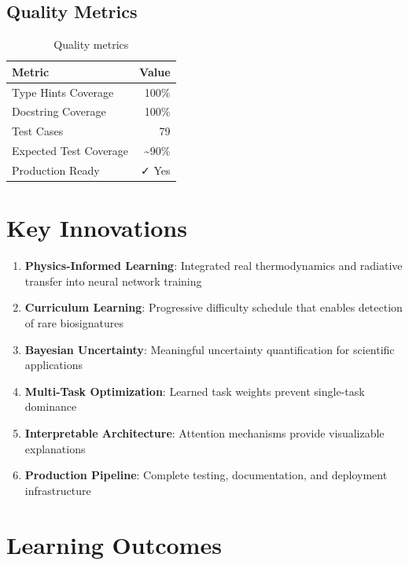 \documentclass[12pt,a4paper,oneside]{report}
\begin{document}
\subsection{Quality Metrics}

\begin{table}[H]
\centering
\begin{tabular}{|l|r|}
\hline
\textbf{Metric} & \textbf{Value} \\
\hline
Type Hints Coverage & 100\% \\
Docstring Coverage & 100\% \\
Test Cases & 79 \\
Expected Test Coverage & \textasciitilde90\% \\
Production Ready & ✓ Yes \\
\hline
\end{tabular}
\caption{Quality metrics}
\end{table}

\section{Key Innovations}

\begin{enumerate}
    \item \textbf{Physics-Informed Learning}: Integrated real thermodynamics and radiative transfer into neural network training

    \item \textbf{Curriculum Learning}: Progressive difficulty schedule that enables detection of rare biosignatures

    \item \textbf{Bayesian Uncertainty}: Meaningful uncertainty quantification for scientific applications

    \item \textbf{Multi-Task Optimization}: Learned task weights prevent single-task dominance

    \item \textbf{Interpretable Architecture}: Attention mechanisms provide visualizable explanations

    \item \textbf{Production Pipeline}: Complete testing, documentation, and deployment infrastructure
\end{enumerate}

\section{Learning Outcomes}
\end{document}
